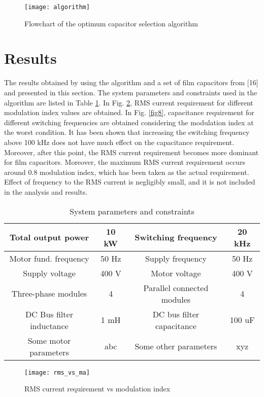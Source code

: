 \documentclass[conference,a4paper,twocolumn]{IEEEtran}
\begin{document}
\begin{figure}[h]
  \centering
  \texttt{[image: algorithm]}
  \caption{Flowchart of the optimum capacitor selection algorithm}
  \label{fig6}
\end{figure}



\section{Results}

The results obtained by using the algorithm and a set of film capacitors from [16] and presented in this section. The system parameters and constraints used in the algorithm are listed in Table \ref{table2}. In Fig. \ref{fig7}, RMS current requirement for different modulation index values are obtained. In Fig. \ref{fig8}, capacitance requirement for different switching frequencies are obtained considering the modulation index at the worst condition. It has been shown that increasing the switching frequency above 100 kHz does not have much effect on the capacitance requirement. Moreover, after this point, the RMS current requirement becomes more dominant for film capacitors. Moreover, the maximum RMS current requirement occurs around 0.8 modulation index, which has been taken as the actual requirement. Effect of frequency to the RMS current is negligibly small, and it is not included in the analysis and results.



\begin{table}[h]
\renewcommand{\arraystretch}{1.4}
\caption{System parameters and constraints}
\label{table2}
\centering
\begin{tabular}{|c|c|c|c|}
\hline
Total output power & 10 kW & Switching frequency & 20 kHz\\
\hline
Motor fund. frequency & 50 Hz & Supply frequency & 50 Hz\\
\hline
Supply voltage & 400 V & Motor voltage & 400 V\\
\hline
Three-phase modules & 4 & Parallel connected modules & 4\\
\hline
DC Bus filter inductance & 1 mH & DC bus filter capacitance & 100 uF\\
\hline
Some motor parameters & abc & Some other parameters & xyz\\
\hline
\end{tabular}
\end{table}


\begin{figure}[h]
  \centering
  \texttt{[image: rms\_vs\_ma]}
  \caption{RMS current requirement vs modulation index}
  \label{fig7}
\end{figure}
\end{document}
